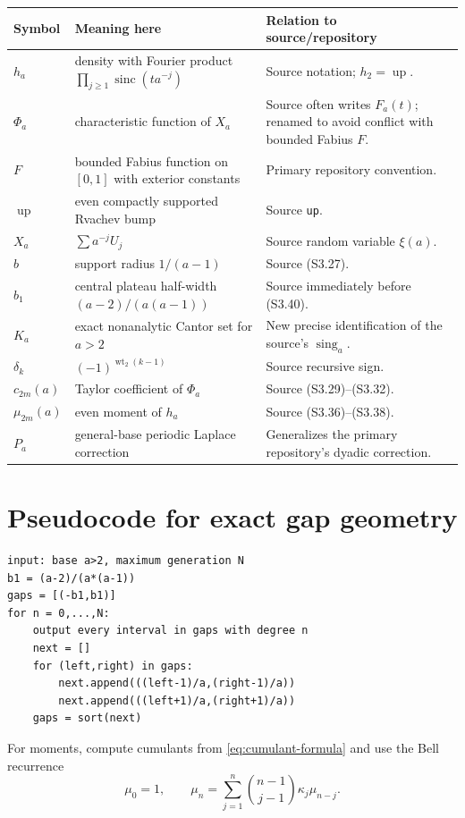 \documentclass[11pt,oneside]{article}
\theoremstyle{definition}
\theoremstyle{remark}
\newcommand{\Up}{\operatorname{up}}
\newcommand{\sinc}{\operatorname{sinc}}
\newcommand{\wt}{\operatorname{wt}_2}
\begin{document}
\begin{longtable}{@{}p{}p{}p{}@{}}
\toprule
Symbol & Meaning here & Relation to source/repository\\
\midrule
\endhead
$h_a$ & density with Fourier product $\prod_{j\ge1}\sinc(ta^{-j})$ & Source notation; $h_2=\Up$.\\
$\Phi_a$ & characteristic function of $X_a$ & Source often writes $F_a(t)$; renamed to avoid conflict with bounded Fabius $F$.\\
$F$ & bounded Fabius function on $[0,1]$ with exterior constants & Primary repository convention.\\
$\Up$ & even compactly supported Rvachev bump & Source \texttt{up}.\\
$X_a$ & $\sum a^{-j}U_j$ & Source random variable $\xi(a)$.\\
$b$ & support radius $1/(a-1)$ & Source (S3.27).\\
$b_1$ & central plateau half-width $(a-2)/(a(a-1))$ & Source immediately before (S3.40).\\
$K_a$ & exact nonanalytic Cantor set for $a>2$ & New precise identification of the source's $\operatorname{sing}_a$.\\
$\delta_k$ & $(-1)^{\wt(k-1)}$ & Source recursive sign.\\
$c_{2m}(a)$ & Taylor coefficient of $\Phi_a$ & Source (S3.29)--(S3.32).\\
$\mu_{2m}(a)$ & even moment of $h_a$ & Source (S3.36)--(S3.38).\\
$P_a$ & general-base periodic Laplace correction & Generalizes the primary repository's dyadic correction.\\
\bottomrule
\end{longtable}

\section{Pseudocode for exact gap geometry}

\begin{lstlisting}[style=pseudo]
input: base a>2, maximum generation N
b1 = (a-2)/(a*(a-1))
gaps = [(-b1,b1)]
for n = 0,...,N:
    output every interval in gaps with degree n
    next = []
    for (left,right) in gaps:
        next.append(((left-1)/a,(right-1)/a))
        next.append(((left+1)/a,(right+1)/a))
    gaps = sort(next)
\end{lstlisting}

For moments, compute cumulants from \eqref{eq:cumulant-formula} and use the Bell recurrence
\begin{equation}
 \mu_0=1,
 \qquad
 \mu_n=\sum_{j=1}^{n}\binom{n-1}{j-1}\kappa_j\mu_{n-j}.
 \label{eq:Bell-recurrence}
\end{equation}
\end{document}
